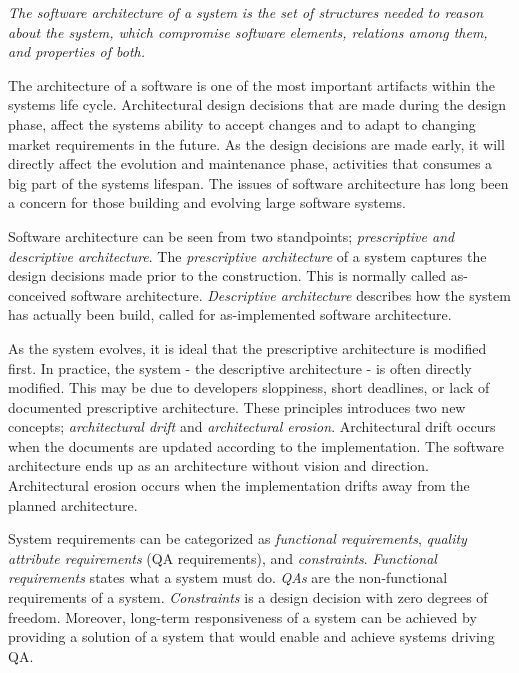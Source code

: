 \begin{displayquote}
\textit{The software architecture of a system is the set of structures needed to reason about the system, which compromise software elements, relations among them, and properties of both.}
\end{displayquote}

The architecture of a software is one of the most important artifacts within the systems life cycle\cite{Bass:2012:SAP:2392670,knodel2006static}. Architectural design decisions that are made during the design phase, affect the systems ability to accept changes and to adapt to changing market requirements in the future. As the design decisions are made early, it will directly affect the evolution and maintenance phase\cite{Pressman:2009:SEP:1593949}, activities that consumes a big part of the systems lifespan\cite{Vliet:2008:SEP:1481475}. The issues of software architecture has long been a concern for those building and evolving large software systems\cite{perry1997state}.

Software architecture can be seen from two standpoints\cite{mooc}; \textit{prescriptive and descriptive architecture}. The \textit{prescriptive architecture} of a system captures the design decisions made prior to the construction. This is normally called as-conceived software architecture. \textit{Descriptive architecture} describes how the system has actually been build, called for as-implemented software architecture. 

As the system evolves, it is ideal that the prescriptive architecture is modified first. In practice, the system - the descriptive architecture - is often directly modified\cite{Bass:2012:SAP:2392670}. This may be due to developers sloppiness, short deadlines, or lack of documented prescriptive architecture. These principles introduces two new concepts; \textit{architectural drift} and \textit{architectural erosion}\cite{Bass:2012:SAP:2392670}. Architectural drift occurs when the documents are updated according to the implementation. The software architecture ends up as an architecture without vision and direction. Architectural erosion occurs when the implementation drifts away from the planned architecture. 

System requirements can be categorized as \textit{functional requirements}, \textit{quality attribute requirements} (QA requirements), and \textit{constraints}\cite{Bass:2012:SAP:2392670}. \textit{Functional requirements} states what a system must do. \textit{QAs} are the non-functional requirements of a system. \textit{Constraints} is a design decision with zero degrees of freedom. Moreover, long-term responsiveness of a system can be achieved by providing a solution of a system that would enable and achieve systems driving QA. 

